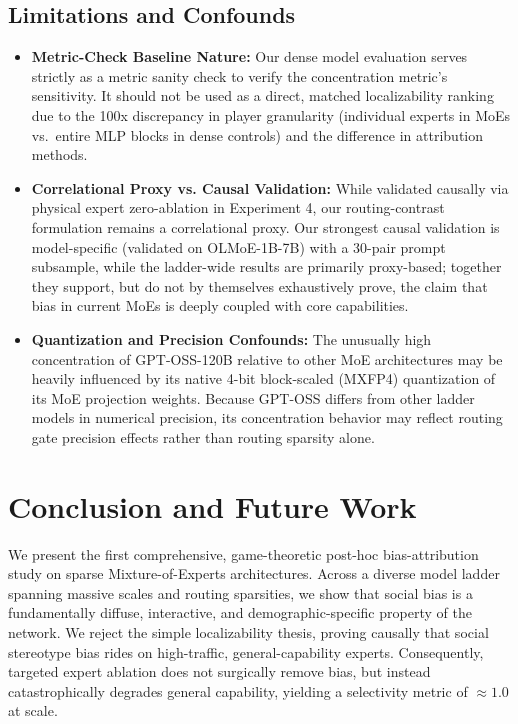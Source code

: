 \documentclass[11pt,a4paper]{article}
\begin{document}
\subsection{Limitations and Confounds}
\begin{itemize}
    \item \textbf{Metric-Check Baseline Nature:} Our dense model evaluation serves strictly as a metric sanity check to verify the concentration metric's sensitivity. It should not be used as a direct, matched localizability ranking due to the 100x discrepancy in player granularity (individual experts in MoEs vs.\ entire MLP blocks in dense controls) and the difference in attribution methods.
    \item \textbf{Correlational Proxy vs. Causal Validation:} While validated causally via physical expert zero-ablation in Experiment 4, our routing-contrast formulation remains a correlational proxy. Our strongest causal validation is model-specific (validated on OLMoE-1B-7B) with a 30-pair prompt subsample, while the ladder-wide results are primarily proxy-based; together they support, but do not by themselves exhaustively prove, the claim that bias in current MoEs is deeply coupled with core capabilities.
    \item \textbf{Quantization and Precision Confounds:} The unusually high concentration of GPT-OSS-120B relative to other MoE architectures may be heavily influenced by its native 4-bit block-scaled (MXFP4) quantization of its MoE projection weights. Because GPT-OSS differs from other ladder models in numerical precision, its concentration behavior may reflect routing gate precision effects rather than routing sparsity alone.
\end{itemize}

\section{Conclusion and Future Work}
We present the first comprehensive, game-theoretic post-hoc bias-attribution study on sparse Mixture-of-Experts architectures. Across a diverse model ladder spanning massive scales and routing sparsities, we show that social bias is a fundamentally diffuse, interactive, and demographic-specific property of the network. We reject the simple localizability thesis, proving causally that social stereotype bias rides on high-traffic, general-capability experts. Consequently, targeted expert ablation does not surgically remove bias, but instead catastrophically degrades general capability, yielding a selectivity metric of $\approx 1.0$ at scale.
\end{document}
